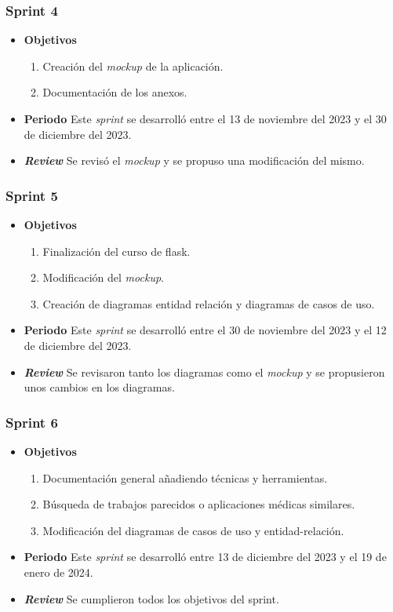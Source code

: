 \subsubsection{Sprint 4}
\begin{itemize}
\item \textbf{Objetivos}
\begin{enumerate}
\item Creación del \textit{mockup} de la aplicación.
\item Documentación de los anexos.
\end{enumerate}
\item \textbf{Periodo}
Este \textsl{sprint} se desarrolló entre el 13 de noviembre del 2023 y el 30 de diciembre del 2023.
\item \textbf{\textsl{Review}}
Se revisó el \textit{mockup} y se propuso una modificación del mismo. 


\end{itemize}


\subsubsection{Sprint 5}
\begin{itemize}
\item \textbf{Objetivos}
\begin{enumerate}
\item Finalización del curso de flask.
\item Modificación del \textit{mockup}.
\item Creación de diagramas entidad relación y diagramas de casos de uso.
\end{enumerate}
\item \textbf{Periodo}
Este \textsl{sprint} se desarrolló entre el 30 de noviembre del 2023 y el 12 de diciembre del 2023.
\item \textbf{\textsl{Review}}
Se revisaron tanto los diagramas como el \textit{mockup} y se propusieron unos cambios en los diagramas. 


\end{itemize}

\subsubsection{Sprint 6}
\begin{itemize}
\item \textbf{Objetivos}
\begin{enumerate}
\item Documentación general añadiendo técnicas y herramientas.
\item Búsqueda de trabajos parecidos o aplicaciones médicas similares.
\item Modificación del diagramas de casos de uso y entidad-relación.
\end{enumerate}
\item \textbf{Periodo}
Este \textsl{sprint} se desarrolló entre 13 de diciembre del 2023 y el 19 de enero de 2024.
\item \textbf{\textsl{Review}}
Se cumplieron todos los objetivos del sprint. 


\end{itemize}
